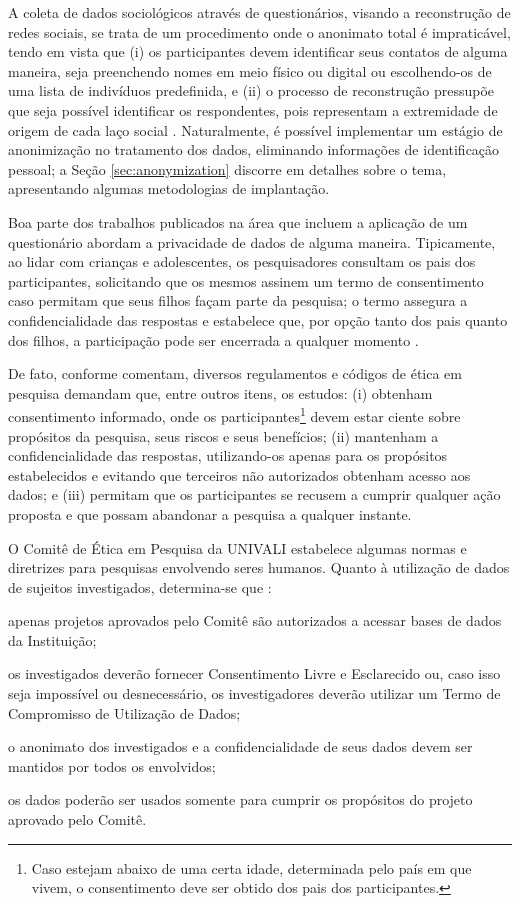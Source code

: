 A coleta de dados sociológicos através de questionários, visando a reconstrução de redes sociais, se trata de um procedimento onde o anonimato total é impraticável, tendo em vista que (i) os participantes devem identificar seus contatos de alguma maneira, seja preenchendo nomes em meio físico ou digital ou escolhendo-os de uma lista de indivíduos predefinida, e (ii) o processo de reconstrução pressupõe que seja possível identificar os respondentes, pois representam a extremidade de origem de cada laço social  \cite{Marsden1990}. Naturalmente, é possível implementar um estágio de anonimização no tratamento dos dados, eliminando informações de identificação pessoal; a Seção \ref{sec:anonymization} discorre em detalhes sobre o tema, apresentando algumas metodologias de implantação.

Boa parte dos trabalhos publicados na área que incluem a aplicação de um questionário abordam a privacidade de dados de alguma maneira. Tipicamente, ao lidar com crianças e adolescentes, os pesquisadores consultam os pais dos participantes, solicitando que os mesmos assinem um termo de consentimento caso permitam que seus filhos façam parte da pesquisa; o termo assegura a confidencialidade das respostas e estabelece que, por opção tanto dos pais quanto dos filhos, a participação pode ser encerrada a qualquer momento \cite{Hymel1986,Schwartz2006,Bellmore2010,Rambaran2017}.

De fato, conforme  comentam, diversos regulamentos e códigos de ética em pesquisa demandam que, entre outros itens, os estudos: (i) obtenham consentimento informado, onde os participantes\footnote{Caso estejam abaixo de uma certa idade, determinada pelo país em que vivem, o consentimento deve ser obtido dos pais dos participantes.} devem estar ciente sobre propósitos da pesquisa, seus riscos e seus benefícios; (ii) mantenham a confidencialidade das respostas, utilizando-os apenas para os propósitos estabelecidos e evitando que terceiros não autorizados obtenham acesso aos dados; e (iii) permitam que os participantes se recusem a cumprir qualquer ação proposta e que possam abandonar a pesquisa a qualquer instante.

O Comitê de Ética em Pesquisa da UNIVALI estabelece algumas normas e diretrizes para pesquisas envolvendo seres humanos. Quanto à utilização de dados de sujeitos investigados, determina-se que \cite{Univali2002}:

\begin{alineas}
    \item apenas projetos aprovados pelo Comitê são autorizados a acessar bases de dados da Instituição;
    \item os investigados deverão fornecer Consentimento Livre e Esclarecido ou, caso isso seja impossível ou desnecessário, os investigadores deverão utilizar um Termo de Compromisso de Utilização de Dados;
    \item o anonimato dos investigados e a confidencialidade de seus dados devem ser mantidos por todos os envolvidos;
    \item os dados poderão ser usados somente para cumprir os propósitos do projeto aprovado pelo Comitê.
\end{alineas}

